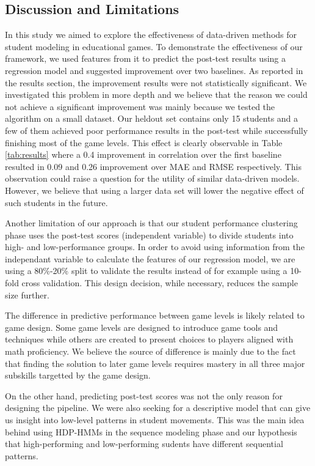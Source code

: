 \documentclass{sigchi}
\begin{document}
\subsection{Discussion and Limitations}
In this study we aimed to explore the effectiveness of data-driven methods for student modeling in educational games. 
To demonstrate the effectiveness of our framework, we used features from it to predict the post-test results using a regression model and suggested improvement over two  baselines.
As reported in the results section, the improvement results were not statistically significant. We investigated this problem in more depth and we believe that the reason we could not achieve a significant improvement was mainly because we tested the algorithm on a small dataset.
Our heldout set contains only 15 students and a few of them achieved poor performance results in the post-test while successfully finishing most of the game levels.
This effect is clearly observable in Table \ref{tab:results} where a 0.4 improvement in correlation over the first baseline resulted in 0.09 and 0.26 improvement over MAE and RMSE respectively. 
This observation could raise a question for the utility of similar data-driven models.
However, we believe that using a larger data set will lower the negative effect of such students in the future.

Another limitation of our approach is that our student performance clustering phase uses the post-test scores (independent variable) to divide students into high- and low-performance groups. 
In order to avoid using information from the independant variable to calculate the features of our regression model, we are using a 80\%-20\% split to validate the results instead of for example using a 10-fold cross validation.
This design decision, while necessary, reduces the sample size further.

The difference in predictive performance between game levels is likely related to game design. 
Some game levels are designed to introduce game tools and techniques while others are created to present choices to players aligned with math proficiency.
We believe the source of difference is mainly due to the fact that finding the solution to later game levels requires mastery in all three major subskills targetted by the game design.

On the other hand, predicting post-test scores was not the only reason for designing the pipeline.
We were also seeking for a descriptive model that can give us insight into low-level patterns in student movements. 
This was the main idea behind using HDP-HMMs in the sequence modeling phase and our hypothesis that high-performing and low-performing sudents have different sequential patterns. 
\end{document}
